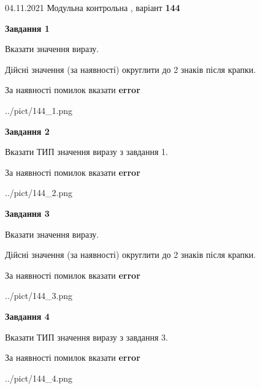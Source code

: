 \documentclass[11pt, ukrainian]{article}
\begin{document}
{04.11.2021 Модульна контрольна , варіант  \No \textbf { 144 }\par}
{
\begin {large}
{\begin {center}\textbf{Завдання 1}\end {center}}\par
Вказати значення виразу. \par
Дійсні значення (за наявності) округлити до 2 знаків після крапки. \par
За наявності помилок вказати \textbf{error}

\begin{center}
	{../pict/144_1.png}
\end{center}
\newpage

{\begin {center}\textbf{Завдання 2}\end {center}}\par
Вказати ТИП значення виразу з завдання 1. \par
За наявності помилок вказати \textbf{error}

\begin{center}
	{../pict/144_2.png}
\end{center}
\newpage

{\begin {center}\textbf{Завдання 3}\end {center}}\par
Вказати значення виразу. \par
Дійсні значення (за наявності) округлити до 2 знаків після крапки. \par
За наявності помилок вказати \textbf{error}

\begin{center}
	{../pict/144_3.png}
\end{center}
\newpage

{\begin {center}\textbf{Завдання 4}\end {center}}\par
Вказати ТИП значення виразу з завдання 3. \par
За наявності помилок вказати \textbf{error}

\begin{center}
	{../pict/144_4.png}
\end{center}
\newpage


\end{large}}
\end{document}
